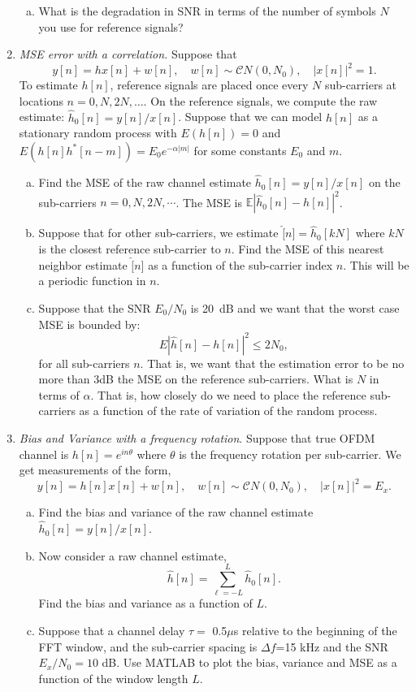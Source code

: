 \documentclass[11pt]{article}
\def\Exp{\mathbb{E}}
\begin{document}
\begin{enumerate}
\begin{enumerate}[(a)]
\item What is the degradation in SNR in terms of the number of symbols $N$ you use for reference signals?
\end{enumerate}


\item \emph{MSE error with a correlation.}  Suppose that 
\[
    y[n]=hx[n]+w[n], \quad w[n] \sim {\mathcal CN}(0,N_0), \quad |x[n]|^2 = 1.
\]
To estimate $h[n]$, reference signals are placed once every $N$ sub-carriers
at locations $n=0,N,2N,\ldots$.
On the reference signals, we compute the raw estimate:
$\hat{h}_0[n] = y[n]/x[n]$.  
Suppose that we can model $h[n]$ as a stationary random process with $E(h[n])=0$
and $E(h[n]h^*[n-m]) = E_0 e^{-\alpha|m|}$ for some constants $E_0$ and $m$.
\begin{enumerate}[(a)]
  \item Find the MSE of the raw channel estimate $\hat{h}_0[n] = y[n]/x[n]$
  on the sub-carriers $n=0,N,2N,\cdots$.  The MSE is $\Exp|\hat{h}_0[n]-h[n]|^2$.
  \item Suppose that for other sub-carriers, we estimate $\hat[n] = \hat{h}_0[kN]$ where $kN$ is the
  closest reference sub-carrier to $n$.  Find the MSE of this nearest neighbor estimate $\hat[n]$ 
  as a function of the sub-carrier index $n$.  This will be a periodic function in $n$.
  \item Suppose that the SNR $E_0/N_0$ is 20~dB and we want that the worst case 
  MSE is bounded by:
  \[   
        E|\hat{h}[n] - h[n]|^2 \leq 2N_0,
  \]
  for all sub-carriers $n$.  That is, we want that the estimation error to be no more than 3dB 
  the MSE on the reference sub-carriers.  What is $N$ in terms of $\alpha$.  That is, how closely
  do we need to place the reference sub-carriers as a function of the rate of variation
  of the random process.
\end{enumerate}

\item \emph{Bias and Variance with a frequency rotation}.  
Suppose that true OFDM channel is $h[n] = e^{in\theta}$ where $\theta$ is the 
frequency rotation per sub-carrier.  We get measurements of the form,
\[
    y[n]=h[n]x[n]+w[n], \quad w[n] \sim {\mathcal CN}(0,N_0), \quad |x[n]|^2 = E_x.
\] 
\begin{enumerate}[(a)]
\item Find the bias and variance of the raw channel estimate $\hat{h}_0[n] = y[n]/x[n]$.

\item Now consider a raw channel estimate, 
\[
    \hat{h}[n] = \sum_{\ell=-L}^L \hat{h}_0[n].
\]
Find the bias and variance as a function of $L$.

\item Suppose that a channel delay $\tau = $ 0.5$\mu$s relative to the beginning of the FFT window,
and the sub-carrier spacing is $\Delta f$=15 kHz and the SNR $E_x/N_0=10$ dB.  Use MATLAB to plot
the bias, variance and MSE as a function of the window length $L$.
\end{enumerate}



\end{enumerate}
\end{document}

